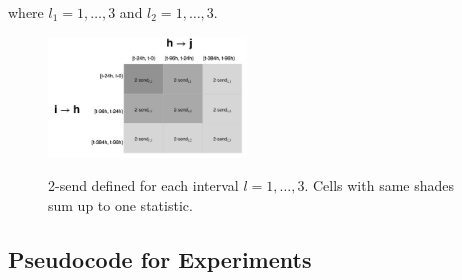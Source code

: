 \documentclass[twoside]{article}
\begin{document}
    where $l_1=1,\ldots,3$ and $l_2=1,\ldots,3$. 
    \begin{figure}[ht]
    	\centering
    	\includegraphics[width=0.47\textwidth]{plots/triadtable.jpg} 
    	\label{fig:triadtable}
    	\caption{2-send defined for each interval $l=1,\ldots,3$. Cells with same shades sum up to one statistic.}
    \end{figure}
    
    \subsection{Pseudocode for Experiments} \label{subsec:Pseudocode for Experiments}
\end{document}
